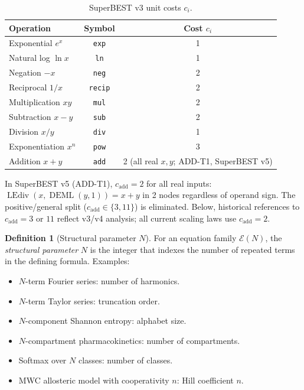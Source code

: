 \documentclass[12pt,a4paper]{article}
\theoremstyle{definition}
\newtheorem{definition}[theorem]{Definition}
\newcommand{\DEML}{\operatorname{DEML}}
\newcommand{\LEdiv}{\operatorname{LEdiv}}
\begin{document}
\begin{table}[h]
\centering
\caption{SuperBEST v3 unit costs $c_i$.}
\label{tab:superbest3}
\smallskip
\begin{tabular}{@{}lcc@{}}
\toprule
\textbf{Operation} & \textbf{Symbol} & \textbf{Cost $c_i$} \\
\midrule
Exponential $e^x$    & \texttt{exp}   & 1 \\
Natural log $\ln x$  & \texttt{ln}    & 1 \\
Negation $-x$        & \texttt{neg}   & 2 \\
Reciprocal $1/x$     & \texttt{recip} & 2 \\
Multiplication $xy$  & \texttt{mul}   & 2 \\
Subtraction $x-y$    & \texttt{sub}   & 2 \\
Division $x/y$       & \texttt{div}   & 1 \\
Exponentiation $x^n$ & \texttt{pow}   & 3 \\
Addition $x+y$       & \texttt{add}   & 2 (all real $x,y$; ADD-T1, SuperBEST v5) \\
\bottomrule
\end{tabular}
\end{table}

\noindent
In SuperBEST v5 (ADD-T1), $c_{\mathrm{add}} = 2$ for all real inputs:
$\LEdiv(x,\DEML(y,1)) = x+y$ in 2 nodes regardless of operand sign.
The positive/general split ($c_{\mathrm{add}} \in \{3, 11\}$) is eliminated.
Below, historical references to $c_{\mathrm{add}} = 3$ or $11$ reflect v3/v4
analysis; all current scaling laws use $c_{\mathrm{add}} = 2$.

\medskip

\begin{definition}[Structural parameter $N$]
\label{def:N}
For an equation family $\mathcal{E}(N)$, the \emph{structural parameter}
$N$ is the integer that indexes the number of repeated terms in the
defining formula.  Examples:
\begin{itemize}
  \item $N$-term Fourier series: number of harmonics.
  \item $N$-term Taylor series: truncation order.
  \item $N$-component Shannon entropy: alphabet size.
  \item $N$-compartment pharmacokinetics: number of compartments.
  \item Softmax over $N$ classes: number of classes.
  \item MWC allosteric model with cooperativity $n$: Hill coefficient $n$.
\end{itemize}
\end{definition}
\end{document}
